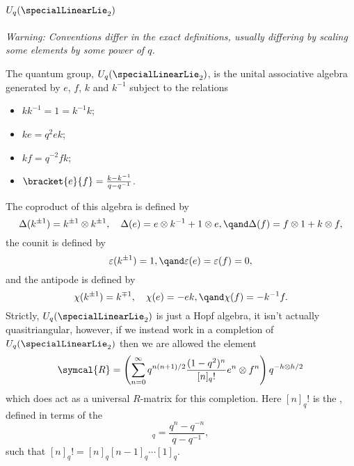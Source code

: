 \documentclass[fleqn]{NotesClass}
\newcommand{\universalRmatrix}{\symcal{R}}
\begin{document}
    \section{\texorpdfstring{\(U_q(\specialLinearLie_2)\)}{Uq(sl2)}}
    \begin{dfn}{}{}
        
        \textit{Warning: Conventions differ in the exact definitions, usually differing by scaling some elements by some power of \(q\).}
        
        The quantum group, \(U_q(\specialLinearLie_2)\), is the unital associative algebra generated by \(e\), \(f\), \(k\) and \(k^{-1}\) subject to the relations
        \begin{itemize}
            \item \(kk^{-1} = 1 = k^{-1}k\);
            \item \(ke = q^2ek\);
            \item \(kf = q^{-2}fk\);
            \item \(\bracket{e}{f} = \frac{k - k^{-1}}{q - q^{-1}}\).
        \end{itemize}
        The coproduct of this algebra is defined by
        \begin{equation*}
            \Delta(k^{\pm 1}) = k^{\pm 1} \otimes k^{\pm 1}, \quad \Delta(e) = e \otimes k^{-1} + 1 \otimes e, \qand \Delta(f) = f \otimes 1 + k \otimes f,
        \end{equation*}
        the counit is defined by
        \begin{equation}
            \varepsilon(k^{\pm 1}) = 1, \qand \varepsilon(e) = \varepsilon(f) = 0,
        \end{equation}
        and the antipode is defined by
        \begin{equation}
            \chi(k^{\pm 1}) = k^{\mp 1}, \quad \chi(e) = -ek, \qand \chi(f) = -k^{-1}f.
        \end{equation}
        Strictly, \(U_q(\specialLinearLie_2)\) is just a Hopf algebra, it isn't actually quasitriangular, however, if we instead work in a completion of \(U_q(\specialLinearLie_2)\) then we are allowed the element
        \begin{equation}
            \universalRmatrix = \left( \sum_{n=0}^{\infty} q^{n(n + 1)/2} \frac{(1 - q^2)^n}{[n]_q!} e^n \otimes f^n \right) q^{-h \otimes h/2}
        \end{equation}
        which does act as a universal \(R\)-matrix for this completion.
        Here \([n]_q!\) is the , defined in terms of the 
        \begin{equation}
            [n]_q = \frac{q^n - q^{-n}}{q - q^{-1}},
        \end{equation}
        such that \([n]_q! = [n]_q [n - 1]_q \dotsm [1]_q\).
    \end{dfn}
    
\end{document}
